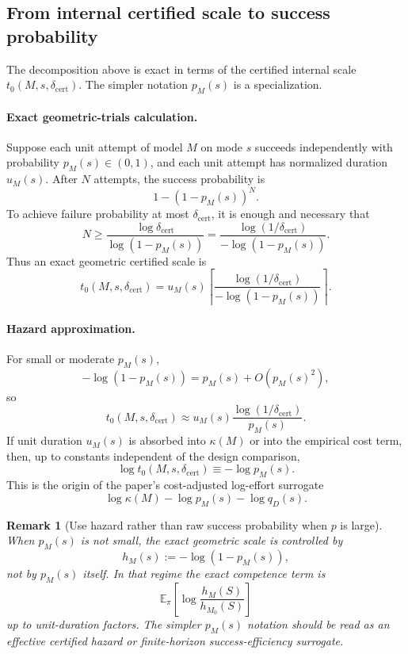 \documentclass{article}
\newtheorem{remark}{Remark}
\newcommand{\E}{\mathbb{E}}
\begin{document}
\subsection{From internal certified scale to success probability}

The decomposition above is exact in terms of the certified internal scale
\(t_0(M,s,\delta_{\mathrm{cert}})\).
The simpler notation \(p_M(s)\) is a specialization.

\paragraph{Exact geometric-trials calculation.}
Suppose each unit attempt of model \(M\) on mode \(s\) succeeds independently with
probability \(p_M(s)\in(0,1)\), and each unit attempt has normalized duration \(u_M(s)\).
After \(N\) attempts, the success probability is
\[
    1-(1-p_M(s))^N.
\]
To achieve failure probability at most \(\delta_{\mathrm{cert}}\), it is enough and necessary that
\[
    N
    \ge
    \frac{\log \delta_{\mathrm{cert}}}{\log(1-p_M(s))}
    =
    \frac{\log(1/\delta_{\mathrm{cert}})}
         {-\log(1-p_M(s))}.
\]
Thus an exact geometric certified scale is
\[
    t_0(M,s,\delta_{\mathrm{cert}})
    =
    u_M(s)
    \left\lceil
    \frac{\log(1/\delta_{\mathrm{cert}})}
         {-\log(1-p_M(s))}
    \right\rceil .
\]

\paragraph{Hazard approximation.}
For small or moderate \(p_M(s)\),
\[
    -\log(1-p_M(s))=p_M(s)+O(p_M(s)^2),
\]
so
\[
    t_0(M,s,\delta_{\mathrm{cert}})
    \approx
    u_M(s)\frac{\log(1/\delta_{\mathrm{cert}})}{p_M(s)}.
\]
If unit duration \(u_M(s)\) is absorbed into \(\kappa(M)\) or into the empirical cost term,
then, up to constants independent of the design comparison,
\[
    \log t_0(M,s,\delta_{\mathrm{cert}})
    \equiv
    -\log p_M(s).
\]
This is the origin of the paper's cost-adjusted log-effort surrogate
\[
    \log\kappa(M)-\log p_M(s)-\log q_D(s).
\]

\begin{remark}[Use hazard rather than raw success probability when \(p\) is large]
When \(p_M(s)\) is not small, the exact geometric scale is controlled by
\[
    h_M(s):=-\log(1-p_M(s)),
\]
not by \(p_M(s)\) itself.
In that regime the exact competence term is
\[
    \E_\pi
    \left[
        \log\frac{h_M(S)}{h_{M_0}(S)}
    \right]
\]
up to unit-duration factors.
The simpler \(p_M(s)\) notation should be read as an effective certified hazard or
finite-horizon success-efficiency surrogate.
\end{remark}
\end{document}
